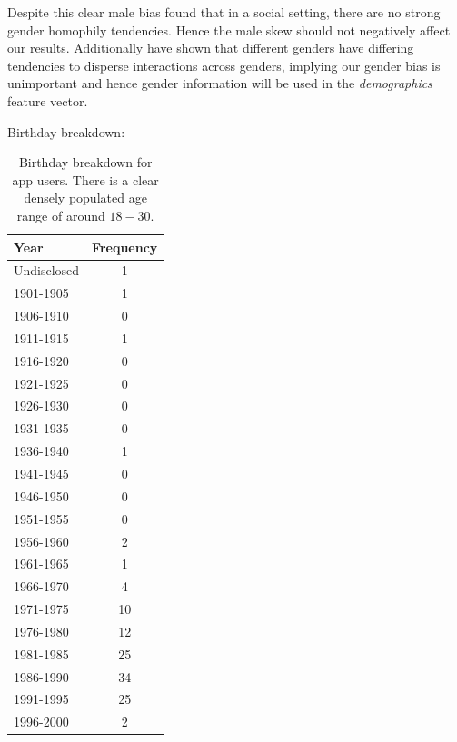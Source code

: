 Despite this clear male bias \cite{jugand} found that in a social setting, there are no strong gender homophily tendencies. Hence the male 
skew should not negatively affect our results. Additionally \cite{backstrom2011center} have shown that different genders have differing 
tendencies to disperse interactions across genders, implying our gender bias is unimportant and hence gender information will be used in 
the \emph{demographics} feature vector.

\clearpage

Birthday breakdown:

\begin{table}[!htbp]
\centering
	\begin{tabular}{|l|c|} %
		\hline
		\textbf{Year} & \textbf{Frequency}  \\ \hline
		Undisclosed & 1 \\ \hline
		1901-1905 & 1 \\ \hline
		1906-1910 & 0 \\ \hline
		1911-1915 & 1 \\ \hline
		1916-1920 & 0 \\ \hline
		1921-1925 & 0 \\ \hline
		1926-1930 & 0 \\ \hline
		1931-1935 & 0 \\ \hline
		1936-1940 & 1 \\ \hline
		1941-1945 & 0 \\ \hline
		1946-1950 & 0 \\ \hline
		1951-1955 & 0 \\ \hline
		1956-1960 & 2 \\ \hline
		1961-1965 & 1 \\ \hline
		1966-1970 & 4 \\ \hline
		1971-1975 & 10 \\ \hline
		1976-1980 & 12 \\ \hline
		1981-1985 & 25 \\ \hline
		1986-1990 & 34 \\ \hline
		1991-1995 & 25 \\ \hline
		1996-2000 & 2 \\ \hline
	\end{tabular}
	\caption{Birthday breakdown for app users. There is a clear densely populated age range of around $18 - 30$.}
	\label{tab:revpol}
\end{table}

